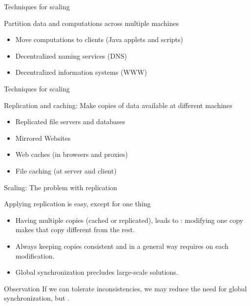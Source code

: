 \begin{slide}{Techniques for scaling}
  \begin{block}{Partition data and computations across multiple machines}
    \begin{itemize}
    \item Move computations to clients (Java applets and scripts)
    \item Decentralized naming services (DNS)
    \item Decentralized information systems (WWW)
    \end{itemize}
  \end{block}
\end{slide}
\begin{slide}{Techniques for scaling} 
  \begin{block}{Replication and caching: Make copies of data available at different machines}
    \begin{itemize}
    \item Replicated file servers and databases
    \item Mirrored Websites
    \item Web caches (in browsers and proxies)
    \item File caching (at server and client)
    \end{itemize}
  \end{block}
\end{slide}
\begin{slide}{Scaling: The problem with replication}
  \begin{block}{Applying replication is easy, except for one thing}
    \begin{itemize}
	\item<2-> Having multiple copies (cached or replicated), leads to : modifying one copy
      makes that copy different from the rest.
	\item<3-> Always keeping copies consistent and in a general way requires  on
      each modification.
	\item<4-> Global synchronization precludes large-scale solutions.
    \end{itemize}
  \end{block}
  \begin{block}{Observation}
    If we can tolerate inconsistencies, we may reduce the need for global synchronization, but    
    .
  \end{block}
\end{slide}

